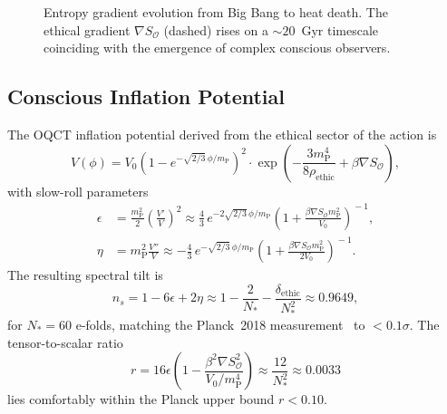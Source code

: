\documentclass[12pt,a4paper]{article}
\theoremstyle{myrmk}
\newcommand{\SO}{\nabla S_{\!\mathcal{O}}}
\newcommand{\mP}{m_{\mathrm{P}}}
\newcommand{\rhoe}{\rho_{\mathrm{ethic}}}
\begin{document}
\begin{figure}[H]
\centering
{}
\caption{Entropy gradient evolution from Big Bang to heat death. The ethical
gradient $\SO$ (dashed) rises on a $\sim20$~Gyr timescale coinciding with the
emergence of complex conscious observers.}
\label{fig:entropy_evo}
\end{figure}

\subsection{Conscious Inflation Potential}

The OQCT inflation potential derived from the ethical sector of the action is
\begin{equation}
  V(\phi) = V_0\!\left(1-e^{-\sqrt{2/3}\,\phi/\mP}\right)^{\!2}
    \cdot\exp\!\left(-\frac{3\mP^4}{8\rhoe}+\beta\SO\right),
  \label{eq:conscious_inflation}
\end{equation}
with slow-roll parameters
\begin{align}
  \epsilon &= \frac{\mP^2}{2}\!\left(\frac{V'}{V}\right)^{\!2}
    \approx \frac{4}{3}\,e^{-2\sqrt{2/3}\,\phi/\mP}
    \!\left(1+\frac{\beta\SO\mP^2}{V_0}\right)^{\!-1},\\
  \eta &= \mP^2\frac{V''}{V}
    \approx -\frac{4}{3}\,e^{-\sqrt{2/3}\,\phi/\mP}
    \!\left(1+\frac{\beta\SO\mP^2}{2V_0}\right)^{\!-1}.
\end{align}
The resulting spectral tilt is
\begin{equation}
  n_s = 1-6\epsilon+2\eta
  \approx 1-\frac{2}{N_*}-\frac{\delta_{\mathrm{ethic}}}{N_*^2}
  \approx 0.9649,
  \label{eq:spectral_tilt}
\end{equation}
for $N_*=60$ e-folds, matching the Planck~2018 measurement~\cite{Planck2018} to
$<0.1\sigma$. The tensor-to-scalar ratio
\begin{equation}
  r = 16\epsilon\!\left(1-\frac{\beta^2\SO^2}{V_0/\mP^4}\right)
  \approx \frac{12}{N_*^2}\approx0.0033
\end{equation}
lies comfortably within the Planck upper bound $r<0.10$.
\end{document}

